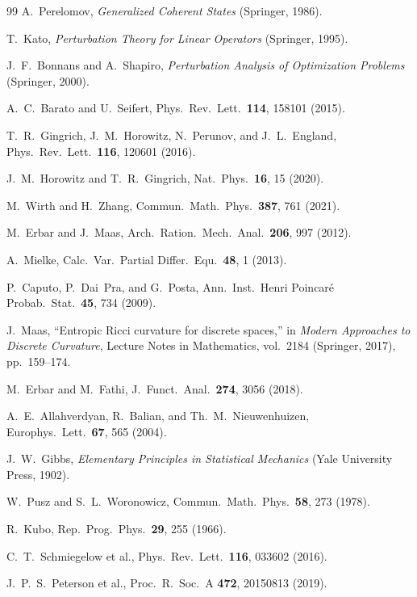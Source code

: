 \documentclass[11pt,a4paper]{article}
\theoremstyle{definition}
\theoremstyle{remark}
\begin{document}
\begin{thebibliography}{99}
A.~Perelomov, \emph{Generalized Coherent States} (Springer, 1986).

T.~Kato, \emph{Perturbation Theory for Linear Operators}
(Springer, 1995).

J.~F.~Bonnans and A.~Shapiro, \emph{Perturbation Analysis of
Optimization Problems} (Springer, 2000).

A.~C.~Barato and U.~Seifert, Phys.\ Rev.\ Lett.\ \textbf{114},
158101 (2015).

T.~R.~Gingrich, J.~M.~Horowitz, N.~Perunov, and J.~L.~England,
Phys.\ Rev.\ Lett.\ \textbf{116}, 120601 (2016).

J.~M.~Horowitz and T.~R.~Gingrich, Nat.\ Phys.\ \textbf{16}, 15
(2020).

M.~Wirth and H.~Zhang, Commun.\ Math.\ Phys.\ \textbf{387}, 761
(2021).

M.~Erbar and J.~Maas, Arch.\ Ration.\ Mech.\ Anal.\ \textbf{206},
997 (2012).

A.~Mielke, Calc.\ Var.\ Partial Differ.\ Equ.\ \textbf{48}, 1
(2013).

P.~Caputo, P.~Dai~Pra, and G.~Posta, Ann.\ Inst.\ Henri
Poincar\'e Probab.\ Stat.\ \textbf{45}, 734 (2009).

J.~Maas, ``Entropic Ricci curvature for discrete spaces,''
in \emph{Modern Approaches to Discrete Curvature}, Lecture Notes
in Mathematics, vol.~2184 (Springer, 2017), pp.~159--174.

M.~Erbar and M.~Fathi, J.~Funct.\ Anal.\ \textbf{274}, 3056 (2018).

A.~E.~Allahverdyan, R.~Balian, and Th.~M.~Nieuwenhuizen,
Europhys.\ Lett.\ \textbf{67}, 565 (2004).

J.~W.~Gibbs, \emph{Elementary Principles in Statistical Mechanics}
(Yale University Press, 1902).

W.~Pusz and S.~L.~Woronowicz, Commun.\ Math.\ Phys.\ \textbf{58},
273 (1978).

R.~Kubo, Rep.\ Prog.\ Phys.\ \textbf{29}, 255 (1966).

C.~T.~Schmiegelow et al., Phys.\ Rev.\ Lett.\ \textbf{116}, 033602 (2016).

J.~P.~S.~Peterson et al., Proc.\ R.\ Soc.\ A \textbf{472}, 20150813 (2019).


\end{thebibliography}
\end{document}
